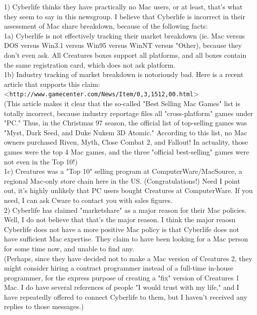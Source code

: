 \documentclass[11pt,twoside,a4paper]{article}
\begin{document}
\begin{multicols*}{2}
1) Cyberlife thinks they have practically no Mac users, or at least, that's what they seem to say in this newsgroup. I believe that Cyberlife is incorrect in their assessment of Mac share breakdown, because of the following facts:~\\

1a) Cyberlife is not effectively tracking their market breakdown (ie. Mac versus DOS versus Win3.1 versus Win95 versus WinNT versus "Other), because they don't even ask. All Creatures boxes support all platforms, and all boxes contain the same registration card, which does not ask platform.~\\

1b) Industry tracking of market breakdown is notoriously bad. Here is a recent article that supports this claim:~\\

      <\texttt{http://www.gamecenter.com/News/Item/0,3,1512,00.html}>~\\

(This article makes it clear that the so-called "Best Selling Mac Games" list is totally incorrect, because industry reportage files all "cross-platform" games under "PC." Thus, in the Christmas 97 season, the official list of top-selling games was "Myst, Dark Seed, and Duke Nukem 3D Atomic." According to this list, no Mac owners purchased Riven, Myth, Close Combat 2, and Fallout! In actuality, those games were the top 4 Mac games, and the three "official best-selling" games were not even in the Top 10!)~\\

1c) Creatures was a "Top 10" selling program at ComputerWare/MacSource, a regional Mac-only store chain here in the US. (Congratulations!) Need I point out, it's highly unlikely that PC users bought Creatures at ComputerWare. If you need, I can ask Cware to contact you with sales figures.~\\

2) Cyberlife has claimed "marketshare" as a major reason for their Mac policies. Well, I do not believe that that's the major reason. I think the major reaosn Cyberlife does not have a more positive Mac policy is that Cyberlife does not have sufficient Mac expertise. They claim to have been looking for a Mac person for some time now, and unable to find any.~\\

(Perhaps, since they have decided not to make a Mac version of Creatures 2, they might consider hiring a contract programmer instead of a full-time in-house programmer, for the express purpose of creating a "fix" version of Creatures 1 Mac. I do have several references of people "I would trust with my life," and I have repeatedly offered to connect Cyberlife to them, but I haven't received any replies to those messages.)~\\


\end{multicols*}
\end{document}

